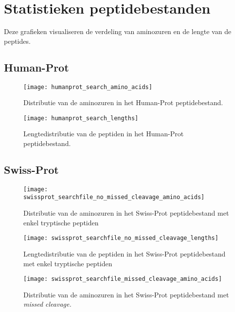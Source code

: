 \chapter{Statistieken peptidebestanden}\label{ch:appendix-statistieken-peptidebestanden}
Deze grafieken visualiseren de verdeling van aminozuren en de lengte van de peptides.

\section{Human-Prot}\label{sec:human-prot-stats}
\begin{figure}[H]
    \centering
    \texttt{[image: humanprot\_search\_amino\_acids]}
    \caption{Distributie van de aminozuren in het Human-Prot peptidebestand.}
    \label{fig:humanprot_search_amino_acids}
\end{figure}

\begin{figure}[H]
    \centering
    \texttt{[image: humanprot\_search\_lengths]}
    \caption{Lengtedistributie van de peptiden in het Human-Prot peptidebestand.}
    \label{fig:humanprot_search_distr}
\end{figure}

\section{Swiss-Prot}\label{sec:swiss-prot-stats}
\begin{figure}[H]
    \centering
    \texttt{[image: swissprot\_searchfile\_no\_missed\_cleavage\_amino\_acids]}
    \caption{Distributie van de aminozuren in het Swiss-Prot peptidebestand met enkel tryptische peptiden}
    \label{fig:swissprot_search_no_missed_cleavage_amino_acids}
\end{figure}

\begin{figure}[H]
    \centering
    \texttt{[image: swissprot\_searchfile\_no\_missed\_cleavage\_lengths]}
    \caption{Lengtedistributie van de peptiden in het Swiss-Prot peptidebestand met enkel tryptische peptiden}
    \label{fig:swissprot_search_no_missed_cleavage_distr}
\end{figure}

\begin{figure}[H]
    \centering
    \texttt{[image: swissprot\_searchfile\_missed\_cleavage\_amino\_acids]}
    \caption{Distributie van de aminozuren in het Swiss-Prot peptidebestand met \textit{missed cleavage.}}
    \label{fig:swissprot_search_missed_cleavage_amino_acids}
\end{figure}

